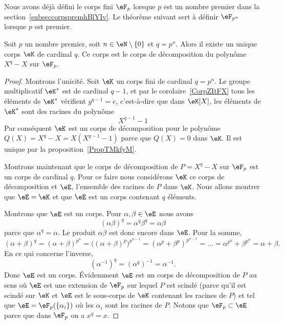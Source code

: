 Nous avons déjà défini le corps fini \( \eF_p\) lorsque \( p\) est un nombre premier dans la section~\ref{subseccorpspremhBlYIv}. Le théorème suivant sert à définir \( \eF_{p^n}\) lorsque \( p\) est premier.
\begin{theorem}     \label{ThoOzgSfy}
	Soit \( p\) un nombre premier, soit \( n\in \eN\setminus\{ 0 \}\) et \( q=p^n\). Alors il existe un unique corps \( \eK\) de cardinal \( q\). Ce corps est le corps de décomposition du polynôme \( X^q-X\) sur \( \eF_p\).
\end{theorem}

\begin{proof}
	Montrons l'unicité. Soit \( \eK\) un corps fini de cardinal \( q=p^n\). Le groupe multiplicatif \( \eK^*\) est de cardinal \( q-1\), et par le corolaire~\ref{CorpZItFX} tous les éléments de \( \eK^*\) vérifient \( g^{q-1}=e\), c'est-à-dire que dans \( \eK[X]\), les éléments de \( \eK^*\) sont des racines du polynôme
	\begin{equation}
		X^{q-1}-1
	\end{equation}
	Par conséquent \( \eK\) est un corps de décomposition pour le polynôme \( Q(X)=X^q-X=X(X^{q-1}-1)\) parce que \( Q(X)=0\) dans \( \eK\). Il est unique par la proposition~\ref{PropTMkfyM}.

	Montrons maintenant que le corps de décomposition de \( P=X^q-X\) sur \( \eF_p\) est un corps de cardinal \( q\). Pour ce faire nous considérons \( \eK\) ce corps de décomposition et \(\eE\), l'ensemble des racines de \( P\) dans \( \eK\). Nous allons montrer que \( \eE=\eK\) et que \( \eE\) est un corps contenant \( q\) éléments.

	Montrons que \( \eE\) est un corps. Pour \( \alpha,\beta\in \eE\) nous avons
	\begin{equation}
		(\alpha\beta)^q=\alpha^q\beta^q=\alpha\beta
	\end{equation}
	parce que \( \alpha^q=\alpha\). Le produit \( \alpha\beta\) est donc encore dans \( \eE\). Pour la somme,
	\begin{equation}
		(\alpha+\beta)^q=(\alpha+\beta)^{p^n}=\Big( (\alpha+\beta)^p \Big)^{p^{n-1}}=(\alpha^p+\beta^p)^{p^{n-1}}=\ldots=\alpha^{p^n}+\beta^{p^n}=\alpha+\beta.
	\end{equation}
	En ce qui concerne l'inverse,
	\begin{equation}
		(\alpha^{-1})^q=(\alpha^q)^{-1}=\alpha^{-1}.
	\end{equation}
	Donc \( \eE\) est un corps. Évidemment \( \eE\) est un corps de décomposition de \( P\) au sens où \( \eE\) est une extension de \( \eF_p\) sur lequel \( P\) est scindé (parce qu'il est scindé sur \( \eK\) et \( \eE\) est le sous-corps de \( \eK\) contenant les racines de \( P\)) et tel que \( \eE=\eF_p(\{ \alpha_i \})\) où les \( \alpha_i\) sont les racines de \( P\). Notons que \( \eF_p\subset \eE\) parce que dans \( \eF_p\) on a \( x^q=x\).


\end{proof}
